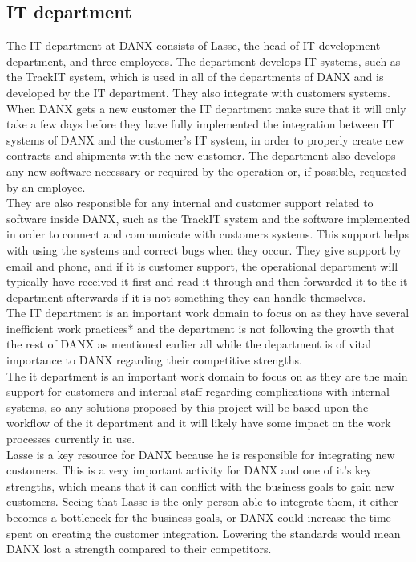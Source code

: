 \subsection{IT department}
The IT department at DANX consists of Lasse, the head of IT development department, and three employees. The department develops IT systems, such as the TrackIT system, which is used in all of the departments of DANX and is developed by the IT department. They also integrate with customers systems. When DANX gets a new customer the IT department make sure that it will only take a few days before they have fully implemented the integration between IT systems of DANX and the customer’s IT system, in order to properly create new contracts and shipments with the new customer. The department also develops any new software necessary or required by the operation or, if possible, requested by an employee.\\
They are also responsible for any internal and customer support related to software inside DANX, such as the TrackIT system and the software implemented in order to connect and communicate with customers systems. This support helps with using the systems and correct bugs when they occur. They give support by email and phone, and if it is customer support, the operational department will typically have received it first and read it through and then forwarded it to the it department afterwards if it is not something they can handle themselves.\\
The IT department is an important work domain to focus on as they have several inefficient work practices* and the department is not following the growth that the rest of DANX as mentioned earlier all while the department is of vital importance to DANX regarding their competitive strengths.\\
The it department is an important work domain to focus on as they are the main support for customers and internal staff regarding complications with internal systems, so any solutions proposed by this project will be based upon the workflow of the it department and it will likely have some impact on the work processes currently in use.\\
Lasse is a key resource for DANX because he is responsible for integrating new customers. This is a very important activity for DANX and one of it’s key strengths, which means that it can conflict with the business goals to gain new customers. Seeing that Lasse is the only person able to integrate them, it either becomes a bottleneck for the business goals, or DANX could increase the time spent on creating the customer integration. Lowering the standards would mean DANX lost a strength compared to their competitors.

